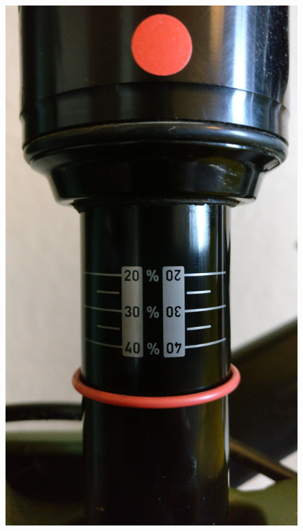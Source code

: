		\begin{figure}[h!]
			\centering
			\includegraphics[scale=0.1,trim={0 140cm 0 0}, clip]{../images/results/100_rs.jpg}

\end{figure}
